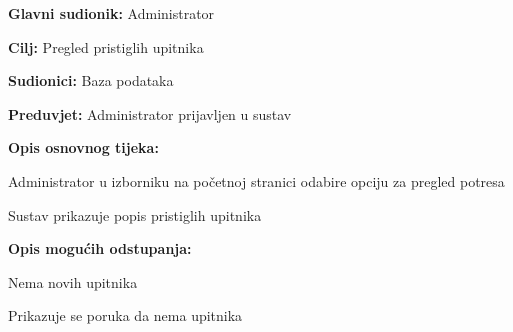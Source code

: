 					\noindent {}
					\begin{packed_item}
	
						\item \textbf{Glavni sudionik:} Administrator
						\item \textbf{Cilj:} Pregled pristiglih upitnika
						\item \textbf{Sudionici:} Baza podataka
						\item \textbf{Preduvjet:} Administrator prijavljen u sustav
						\item \textbf{Opis osnovnog tijeka:}
						
						\item[] \begin{packed_enum}
	
							\item Administrator u izborniku na početnoj stranici odabire opciju za pregled potresa
							\item Sustav prikazuje popis pristiglih upitnika
							
						\end{packed_enum}
						
						\item  \textbf{Opis mogućih odstupanja:}
						
						\item[] \begin{packed_item}
	
							\item[2.a] Nema novih upitnika
							\item[] \begin{packed_enum}
								
								\item Prikazuje se poruka da nema upitnika
								
							\end{packed_enum}
							
						\end{packed_item}
					\end{packed_item}


